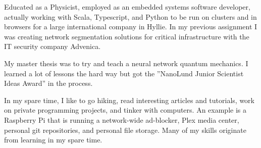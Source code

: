 

Educated as a Physicist, employed as an embedded systems software developer,
actually working with Scala, Typescript, and Python to be run on clusters and
in browsers for a large international company in Hyllie. In my previous
assignment I was creating network segmentation solutions for critical
infrastructure with the IT security company Advenica.

My master thesis was to try and teach a neural network quantum mechanics. I
learned a lot of lessons the hard way but got the ”NanoLund Junior Scientist
Ideas Award” in the process.

In my spare time, I like to go hiking, read interesting articles and
tutorials, work on private programming projects, and tinker with computers. An
example is a Raspberry Pi that is running a network-wide ad-blocker, Plex
media center, personal git repositories, and personal file storage. Many of my
skills originate from learning in my spare time.

